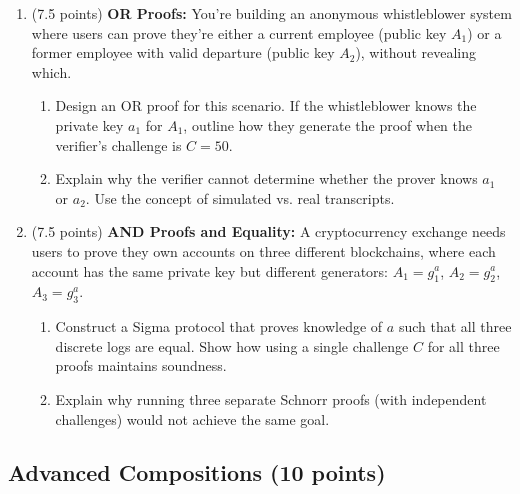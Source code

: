 \documentclass[10pt,a4paper,american]{exam}
\begin{document}
\begin{enumerate}
	\item (7.5 points) \textbf{OR Proofs:}
	      You're building an anonymous whistleblower system where users can prove they're either a current employee (public key $A_1$) or a former employee with valid departure (public key $A_2$), without revealing which.
	      \begin{enumerate}
		      \item Design an OR proof for this scenario. If the whistleblower knows the private key $a_1$ for $A_1$, outline how they generate the proof when the verifier's challenge is $C = 50$.
		      \item Explain why the verifier cannot determine whether the prover knows $a_1$ or $a_2$. Use the concept of simulated vs. real transcripts.
	      \end{enumerate}
	\item (7.5 points) \textbf{AND Proofs and Equality:}
	      A cryptocurrency exchange needs users to prove they own accounts on three different blockchains, where each account has the same private key but different generators: $A_1 = g_1^a$, $A_2 = g_2^a$, $A_3 = g_3^a$.
	      \begin{enumerate}
		      \item Construct a Sigma protocol that proves knowledge of $a$ such that all three discrete logs are equal. Show how using a single challenge $C$ for all three proofs maintains soundness.
		      \item Explain why running three separate Schnorr proofs (with independent challenges) would not achieve the same goal.
	      \end{enumerate}
\end{enumerate}

\subsection{Advanced Compositions (10 points)}
\end{document}

